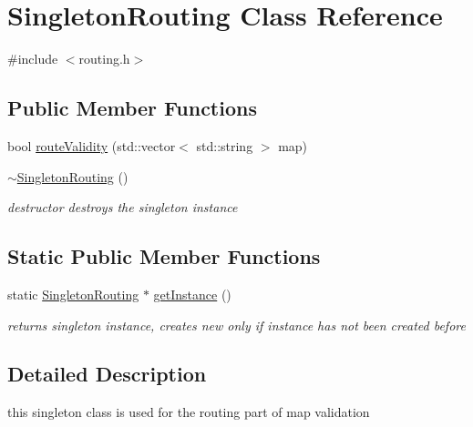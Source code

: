 \hypertarget{class_singleton_routing}{}\section{Singleton\+Routing Class Reference}
\label{class_singleton_routing}


{\ttfamily \#include $<$routing.\+h$>$}

\subsection*{Public Member Functions}
\begin{DoxyCompactItemize}
\item 
bool \hyperlink{class_singleton_routing_a2d5ddb26bf336e4877344353170bab61}{route\+Validity} (std\+::vector$<$ std\+::string $>$ map)
\item 
\hypertarget{class_singleton_routing_ad97e4a54e47729251e5d576655824405}{}\label{class_singleton_routing_ad97e4a54e47729251e5d576655824405} 
\hyperlink{class_singleton_routing_ad97e4a54e47729251e5d576655824405}{$\sim$\+Singleton\+Routing} ()
\begin{DoxyCompactList}\small\item\em destructor destroys the singleton instance \end{DoxyCompactList}\end{DoxyCompactItemize}
\subsection*{Static Public Member Functions}
\begin{DoxyCompactItemize}
\item 
\hypertarget{class_singleton_routing_aa56625d13e947f92f0e92b16b2aa15ea}{}\label{class_singleton_routing_aa56625d13e947f92f0e92b16b2aa15ea} 
static \hyperlink{class_singleton_routing}{Singleton\+Routing} $\ast$ \hyperlink{class_singleton_routing_aa56625d13e947f92f0e92b16b2aa15ea}{get\+Instance} ()
\begin{DoxyCompactList}\small\item\em returns singleton instance, creates new only if instance has not been created before \end{DoxyCompactList}\end{DoxyCompactItemize}


\subsection{Detailed Description}
this singleton class is used for the routing part of map validation 

